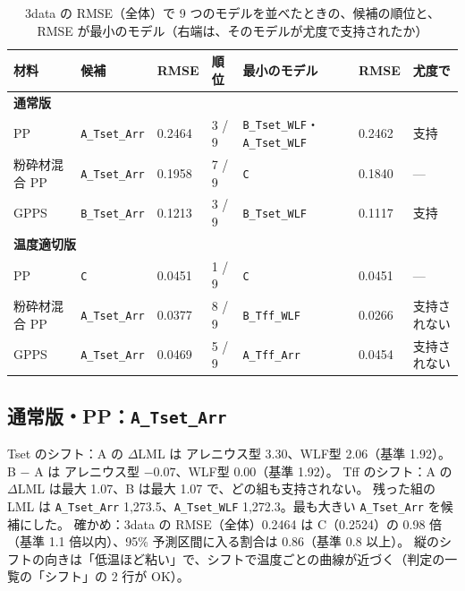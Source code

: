 \documentclass[paper=a4paper,fontsize=10.5pt,line_length=44zw,number_of_lines=40]{jlreq}
\let\origtextbf\textbf
\renewcommand{\textbf}[1]{\origtextbf{\gtfamily #1}}   %
\begin{document}
\begin{table}[H]\centering\footnotesize
\caption{3data の RMSE（全体）で 9 つのモデルを並べたときの、候補の順位と、RMSE が最小のモデル（右端は、そのモデルが尤度で支持されたか）}\label{tab:rank}
\begin{tabular}{lllllll}
\toprule
材料 & 候補 & RMSE & 順位 & 最小のモデル & RMSE & 尤度で \\
\midrule
\multicolumn{7}{l}{\textbf{通常版}} \\
PP & \texttt{A\_\allowbreak{}Tset\_\allowbreak{}Arr} & 0.2464 & 3 / 9 & \texttt{B\_\allowbreak{}Tset\_\allowbreak{}WLF}・\texttt{A\_\allowbreak{}Tset\_\allowbreak{}WLF} & 0.2462 & 支持 \\
粉砕材混合 PP & \texttt{A\_\allowbreak{}Tset\_\allowbreak{}Arr} & 0.1958 & 7 / 9 & \texttt{C} & 0.1840 & --- \\
GPPS & \texttt{B\_\allowbreak{}Tset\_\allowbreak{}Arr} & 0.1213 & 3 / 9 & \texttt{B\_\allowbreak{}Tset\_\allowbreak{}WLF} & 0.1117 & 支持 \\
\midrule
\multicolumn{7}{l}{\textbf{温度適切版}} \\
PP & \texttt{C} & 0.0451 & 1 / 9 & \texttt{C} & 0.0451 & --- \\
粉砕材混合 PP & \texttt{A\_\allowbreak{}Tset\_\allowbreak{}Arr} & 0.0377 & 8 / 9 & \texttt{B\_\allowbreak{}Tff\_\allowbreak{}WLF} & 0.0266 & 支持されない \\
GPPS & \texttt{A\_\allowbreak{}Tset\_\allowbreak{}Arr} & 0.0469 & 5 / 9 & \texttt{A\_\allowbreak{}Tff\_\allowbreak{}Arr} & 0.0454 & 支持されない \\
\bottomrule
\end{tabular}
\end{table}

\subsection{通常版・PP：\texttt{A\_\allowbreak{}Tset\_\allowbreak{}Arr}}
Tset のシフト：A の $\Delta$LML は アレニウス型 3.30、WLF型 2.06（基準 1.92）。B − A は アレニウス型 $-0.07$、WLF型 0.00（基準 1.92）。 Tff のシフト：A の $\Delta$LML は最大 1.07、B は最大 1.07 で、どの組も支持されない。 残った組の LML は \texttt{A\_\allowbreak{}Tset\_\allowbreak{}Arr} 1,273.5、\texttt{A\_\allowbreak{}Tset\_\allowbreak{}WLF} 1,272.3。最も大きい \texttt{A\_\allowbreak{}Tset\_\allowbreak{}Arr} を候補にした。 確かめ：3data の RMSE（全体）0.2464 は C（0.2524）の 0.98 倍（基準 1.1 倍以内）、95\% 予測区間に入る割合は 0.86（基準 0.8 以上）。 縦のシフトの向きは「低温ほど粘い」で、シフトで温度ごとの曲線が近づく（判定の一覧の「シフト」の 2 行が OK）。
\end{document}
